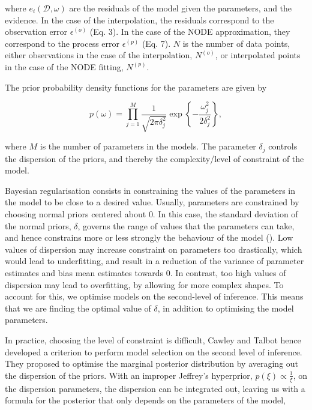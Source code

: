 \documentclass[11pt, oneside]{article}
\begin{document}
where $e_i(\mathcal{D},\omega)$ are the residuals of the model given the parameters, and the evidence. 
In the case of the interpolation, the residuals correspond to the observation error $\epsilon^{(o)}$ (Eq. 3).
In the case of the NODE approximation, they correspond to the process error $\epsilon^{(p)}$ (Eq. 7).
$N$ is the number of data points, either observations in the case of the interpolation, $N^{(o)}$, or interpolated points in the case of the NODE fitting, $N^{(p)}$.

The prior probability density functions for the parameters are given by

\vspace{-0.5cm}
\begin{equation}
	p(\omega) = \prod_{j=1}^{M} \frac{1}{\sqrt{2\pi\delta_j^2}}  \exp \left\{ -\frac{\omega_j^2}{2\delta_j^2}  \right\},
\end{equation}

where $M$ is the number of parameters in the models.
The parameter $\delta_j$ controls the dispersion of the priors, and thereby the complexity/level of constraint of the model.

Bayesian regularisation consists in constraining the values of the parameters in the model to be close to a desired value. 
Usually, parameters are constrained by choosing normal priors centered about 0.
In this case, the standard deviation of the normal priors, $\delta$, governs the range of values that the parameters can take, and hence constrains more or less strongly the behaviour of the model (\cite{Cawley2007}).
Low values of dispersion may increase constraint on parameters too drastically, which would lead to underfitting, and result in a reduction of the variance of parameter estimates and bias mean estimates towards 0.
In contrast, too high values of dispersion may lead to overfitting, by allowing for more complex shapes.
To account for this, we optimise models on the second-level of inference.
This means that we are finding the optimal value of $\delta$, in addition to optimising the model parameters. 

In practice, choosing the level of constraint is difficult, Cawley and Talbot hence developed a criterion to perform model selection on the second level of inference.
They proposed to optimise the marginal posterior distribution by averaging out the dispersion of the priors.
With an improper Jeffrey's hyperprior, $p(\xi) \propto \frac{1}{\xi}$, on the dispersion parameters, the dispersion can be integrated out, leaving us with a formula for the posterior that only depends on the parameters of the model,
\end{document}
